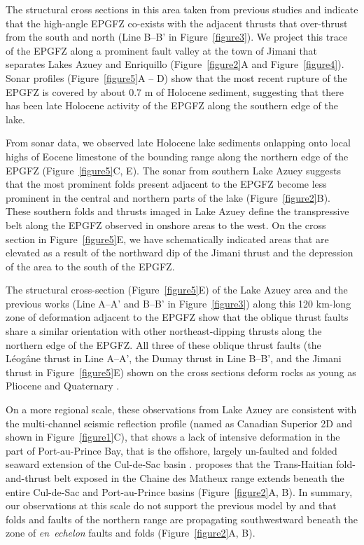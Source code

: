\documentclass[linenumbers,draft]{agujournal}
\begin{document}
The structural cross sections in this area taken from previous studies \citep{massoni1955haiti,mann1995actively,douilly2015three} and indicate that the high-angle EPGFZ co-exists with the adjacent thrusts that over-thrust from the south and north (Line B--B' in Figure~\ref{figure3}). We project this trace of the EPGFZ along a prominent fault valley at the town of Jimani that separates Lakes Azuey and Enriquillo (Figure~\ref{figure2}A and Figure~\ref{figure4}). Sonar profiles (Figure~\ref{figure5}A -- D) show that the most recent rupture of the EPGFZ is covered by about 0.7 m of Holocene sediment, suggesting that there has been late Holocene activity of the EPGFZ along the southern edge of the lake.

From sonar data, we observed late Holocene lake sediments onlapping onto local highs of Eocene limestone of the bounding range along the northern edge of the EPGFZ (Figure~\ref{figure5}C, E). The sonar from southern Lake Azuey suggests that the most prominent folds present adjacent to the EPGFZ become less prominent in the central and northern parts of the lake (Figure~\ref{figure2}B). These southern folds and thrusts imaged in Lake Azuey define the transpressive belt along the EPGFZ observed in onshore areas to the west. On the cross section in Figure~\ref{figure5}E, we have schematically indicated areas that are elevated as a result of the northward dip of the Jimani thrust and the depression of the area to the south of the EPGFZ.

The structural cross-section (Figure~\ref{figure5}E) of the Lake Azuey area and the previous works \citep{massoni1955haiti,bourgueil1988synthese,cox2011shear,douilly2015three} (Line A--A' and B--B' in Figure~\ref{figure3}) along this 120 km-long zone of deformation adjacent to the EPGFZ show that the oblique thrust faults share a similar orientation with other northeast-dipping thrusts along the northern edge of the EPGFZ. All three of these oblique thrust faults (the L\'eog\^ane thrust in Line A--A', the Dumay thrust in Line B--B', and the Jimani thrust in Figure~\ref{figure5}E) shown on the cross sections deform rocks as young as Pliocene and Quaternary \citep{saint2015seismotectonics}. 

On a more regional scale, these observations from Lake Azuey are consistent with the multi-channel seismic reflection profile (named as Canadian Superior 2D and shown in Figure~\ref{figure1}C), that shows a lack of intensive deformation in the part of Port-au-Prince Bay, that is the offshore, largely un-faulted and folded seaward extension of the Cul-de-Sac basin \citep{mchugh2011offshore}. \citet{pubellier2000plate} proposes that the Trans-Haitian fold-and-thrust belt exposed in the Chaine des Matheux range extends beneath the entire Cul-de-Sac and Port-au-Prince basins (Figure~\ref{figure2}A, B). In summary, our observations at this scale do not support the previous model by \citet{pubellier2000plate} and \citet{calais2010transpressional} that folds and faults of the northern range are propagating southwestward beneath the zone of \textit{en~echelon} faults and folds (Figure~\ref{figure2}A, B).
\end{document}
